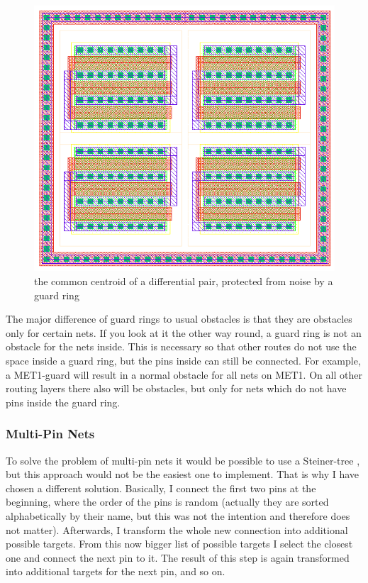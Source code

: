 \begin{figure}
	\centering
	\includegraphics[scale=.6]{FIG/guard_ring.png}
  	\caption{the common centroid of a differential pair, protected from noise by a guard ring}
	\label{fig:guard_ring}
\end{figure}

The major difference of guard rings to usual obstacles is that they are obstacles only for certain nets. If you look at it the other way round, a guard ring is not an obstacle for the nets inside. This is necessary so that other routes do not use the space inside a guard ring, but the pins inside can still be connected. For example, a MET1-guard will result in a normal obstacle for all nets on MET1. On all other routing layers there also will be obstacles, but only for nets which do not have pins inside the guard ring.

\subsubsection{Multi-Pin Nets}
To solve the problem of multi-pin nets it would be possible to use a Steiner-tree , but this approach would not be the easiest one to implement. That is why I have chosen a different solution. Basically, I connect the first two pins at the beginning, where the order of the pins is random (actually they are sorted alphabetically by their name, but this was not the intention and therefore does not matter). Afterwards, I transform the whole new connection into additional possible targets. From this now bigger list of possible targets I select the closest one and connect the next pin to it. The result of this step is again transformed into additional targets for the next pin, and so on.

